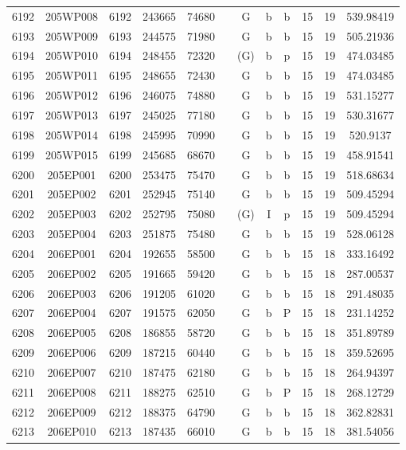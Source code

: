 \begin{tabular}{|*{12}{c|}}
6192 & 205WP008 & 6192 & 243665 & 74680 &  & G & b & b & 15 & 19 & 539.98419 \\ 
6193 & 205WP009 & 6193 & 244575 & 71980 &  & G & b & b & 15 & 19 & 505.21936 \\ 
6194 & 205WP010 & 6194 & 248455 & 72320 &  & (G) & b & p & 15 & 19 & 474.03485 \\ 
6195 & 205WP011 & 6195 & 248655 & 72430 &  & G & b & b & 15 & 19 & 474.03485 \\ 
6196 & 205WP012 & 6196 & 246075 & 74880 &  & G & b & b & 15 & 19 & 531.15277 \\ 
6197 & 205WP013 & 6197 & 245025 & 77180 &  & G & b & b & 15 & 19 & 530.31677 \\ 
6198 & 205WP014 & 6198 & 245995 & 70990 &  & G & b & b & 15 & 19 & 520.9137 \\ 
6199 & 205WP015 & 6199 & 245685 & 68670 &  & G & b & b & 15 & 19 & 458.91541 \\ 
6200 & 205EP001 & 6200 & 253475 & 75470 &  & G & b & b & 15 & 19 & 518.68634 \\ 
6201 & 205EP002 & 6201 & 252945 & 75140 &  & G & b & b & 15 & 19 & 509.45294 \\ 
6202 & 205EP003 & 6202 & 252795 & 75080 &  & (G) & I & p & 15 & 19 & 509.45294 \\ 
6203 & 205EP004 & 6203 & 251875 & 75480 &  & G & b & b & 15 & 19 & 528.06128 \\ 
6204 & 206EP001 & 6204 & 192655 & 58500 &  & G & b & b & 15 & 18 & 333.16492 \\ 
6205 & 206EP002 & 6205 & 191665 & 59420 &  & G & b & b & 15 & 18 & 287.00537 \\ 
6206 & 206EP003 & 6206 & 191205 & 61020 &  & G & b & b & 15 & 18 & 291.48035 \\ 
6207 & 206EP004 & 6207 & 191575 & 62050 &  & G & b & P & 15 & 18 & 231.14252 \\ 
6208 & 206EP005 & 6208 & 186855 & 58720 &  & G & b & b & 15 & 18 & 351.89789 \\ 
6209 & 206EP006 & 6209 & 187215 & 60440 &  & G & b & b & 15 & 18 & 359.52695 \\ 
6210 & 206EP007 & 6210 & 187475 & 62180 &  & G & b & b & 15 & 18 & 264.94397 \\ 
6211 & 206EP008 & 6211 & 188275 & 62510 &  & G & b & P & 15 & 18 & 268.12729 \\ 
6212 & 206EP009 & 6212 & 188375 & 64790 &  & G & b & b & 15 & 18 & 362.82831 \\ 
6213 & 206EP010 & 6213 & 187435 & 66010 &  & G & b & b & 15 & 18 & 381.54056 \\ 

\end{tabular}
